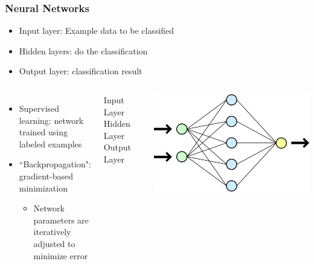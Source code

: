 \documentclass[10pt,professionalfonts,xcolor=table]{beamer}
\begin{document}
\begin{frame}
\frametitle{Neural Networks}

\begin{itemize}
\bang A neural network is a ``feedforward graph" of layers
  \begin{itemize}
  \item Each node, receives input \textit{only} from nodes in previous layers

  \end{itemize}
\gap
  \item Input layer: Example data to be classified
  \item Hidden layers: do the classification
  \item Output layer: classification result

\end{itemize}
\vspace{30pt}
\begin{columns}[c]

  \begin{itemize}
  \item Supervised learning: network trained using labeled examples
  \gap
  \item ``Backpropagation": gradient-based minimization
    \begin{itemize}
    \item Network parameters are iteratively adjusted to minimize error
    \end{itemize}
  \end{itemize}
\begin{columns}[c]
\centering \footnotesize
Input Layer
\centering \footnotesize
Hidden Layer
\centering \footnotesize
Output Layer
\end{columns}
\centering
\includegraphics[width=1\textwidth]{figures/figures/basicNN.png}
\end{columns}


\end{frame}
\end{document}
